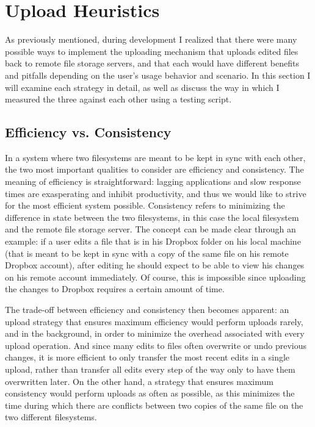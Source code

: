 \documentclass[pageno]{jpaper}
\begin{document}
\section{Upload Heuristics}
\label{sec:upload}
As previously mentioned, during development I realized that there were many possible ways to implement the uploading mechanism that uploads edited files back to remote file storage servers, and that each would have different benefits and pitfalls depending on the user's usage behavior and scenario. In this section I will examine each strategy in detail, as well as discuss the way in which I measured the three against each other using a testing script.

\subsection{Efficiency vs. Consistency}
In a system where two filesystems are meant to be kept in sync with each other, the two most important qualities to consider are efficiency and consistency. The meaning of efficiency is straightforward: lagging applications and slow response times are exasperating and inhibit productivity, and thus we would like to strive for the most efficient system possible. Consistency refers to minimizing the difference in state between the two filesystems, in this case the local filesystem and the remote file storage server. The concept can be made clear through an example: if a user edits a file that is in his Dropbox folder on his local machine (that is meant to be kept in sync with a copy of the same file on his remote Dropbox account), after editing he should expect to be able to view his changes on his remote account immediately. Of course, this is impossible since uploading the changes to Dropbox requires a certain amount of time.

The trade-off between efficiency and consistency then becomes apparent: an upload strategy that ensures maximum efficiency would perform uploads rarely, and in the background, in order to minimize the overhead associated with every upload operation. And since many edits to files often overwrite or undo previous changes, it is more efficient to only transfer the most recent edits in a single upload, rather than transfer all edits every step of the way only to have them overwritten later. On the other hand, a strategy that ensures maximum consistency would perform uploads as often as possible, as this minimizes the time during which there are conflicts between two copies of the same file on the two different filesystems.
\end{document}
